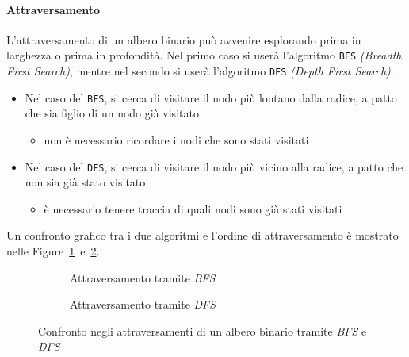 \documentclass[italian, 10pt]{article}
\begin{document}
\paragraph{Attraversamento}
\label{attraversamento-albero-binario}

L'attraversamento di un albero binario può avvenire esplorando prima in larghezza o prima in profondità.
Nel primo caso si userà l'algoritmo \texttt{BFS} \textit{(Breadth First Search)}, mentre nel secondo si userà l'algoritmo \texttt{DFS} \textit{(Depth First Search)}.

\begin{itemize}
  \item Nel caso del \texttt{BFS}, si cerca di visitare il nodo più lontano dalla radice, a patto che sia figlio di un nodo già visitato
        \begin{itemize}
          \item non è necessario ricordare i nodi che sono stati visitati
        \end{itemize}
  \item Nel caso del \texttt{DFS}, si cerca di visitare il nodo più vicino alla radice, a patto che non sia già stato visitato
        \begin{itemize}
          \item è necessario tenere traccia di quali nodi sono già stati visitati
        \end{itemize}
\end{itemize}

\bigskip
Un confronto grafico tra i due algoritmi e l'ordine di attraversamento è mostrato nelle Figure~\ref{fig:attraversamento-albero-bfs}~e~\ref{fig:attraversamento-albero-dfs}.

\begin{figure}
  \bigskip
  \centering
  \begin{subfigure}[t]{0.45\textwidth}
    \centering
    \caption{Attraversamento tramite \textit{BFS}}
    \label{fig:attraversamento-albero-bfs}
  \end{subfigure}
  \begin{subfigure}[t]{0.45\textwidth}
    \centering
    \caption{Attraversamento tramite \textit{DFS}}
    \label{fig:attraversamento-albero-dfs}
  \end{subfigure}
  \caption{Confronto negli attraversamenti di un albero binario tramite \textit{BFS} e \textit{DFS}}
  \label{fig:confronto-attraversamento-bfs-dfs}
  \bigskip
\end{figure}
\end{document}

